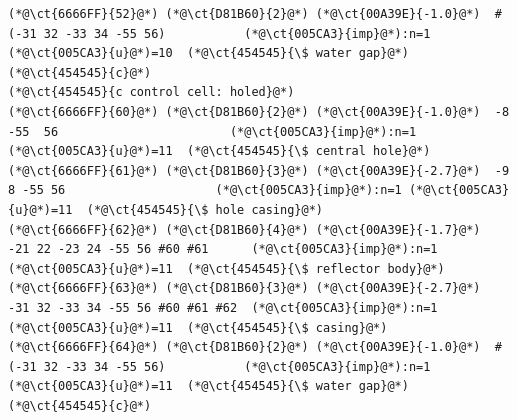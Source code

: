 \begin{lstlisting}
(*@\ct{6666FF}{52}@*) (*@\ct{D81B60}{2}@*) (*@\ct{00A39E}{-1.0}@*)  #(-31 32 -33 34 -55 56)           (*@\ct{005CA3}{imp}@*):n=1 (*@\ct{005CA3}{u}@*)=10  (*@\ct{454545}{\$ water gap}@*)
(*@\ct{454545}{c}@*)
(*@\ct{454545}{c control cell: holed}@*)
(*@\ct{6666FF}{60}@*) (*@\ct{D81B60}{2}@*) (*@\ct{00A39E}{-1.0}@*)  -8 -55  56                        (*@\ct{005CA3}{imp}@*):n=1 (*@\ct{005CA3}{u}@*)=11  (*@\ct{454545}{\$ central hole}@*)
(*@\ct{6666FF}{61}@*) (*@\ct{D81B60}{3}@*) (*@\ct{00A39E}{-2.7}@*)  -9   8 -55 56                     (*@\ct{005CA3}{imp}@*):n=1 (*@\ct{005CA3}{u}@*)=11  (*@\ct{454545}{\$ hole casing}@*)
(*@\ct{6666FF}{62}@*) (*@\ct{D81B60}{4}@*) (*@\ct{00A39E}{-1.7}@*)  -21 22 -23 24 -55 56 #60 #61      (*@\ct{005CA3}{imp}@*):n=1 (*@\ct{005CA3}{u}@*)=11  (*@\ct{454545}{\$ reflector body}@*)
(*@\ct{6666FF}{63}@*) (*@\ct{D81B60}{3}@*) (*@\ct{00A39E}{-2.7}@*)  -31 32 -33 34 -55 56 #60 #61 #62  (*@\ct{005CA3}{imp}@*):n=1 (*@\ct{005CA3}{u}@*)=11  (*@\ct{454545}{\$ casing}@*)
(*@\ct{6666FF}{64}@*) (*@\ct{D81B60}{2}@*) (*@\ct{00A39E}{-1.0}@*)  #(-31 32 -33 34 -55 56)           (*@\ct{005CA3}{imp}@*):n=1 (*@\ct{005CA3}{u}@*)=11  (*@\ct{454545}{\$ water gap}@*)
(*@\ct{454545}{c}@*)
\end{lstlisting}
\newpage
